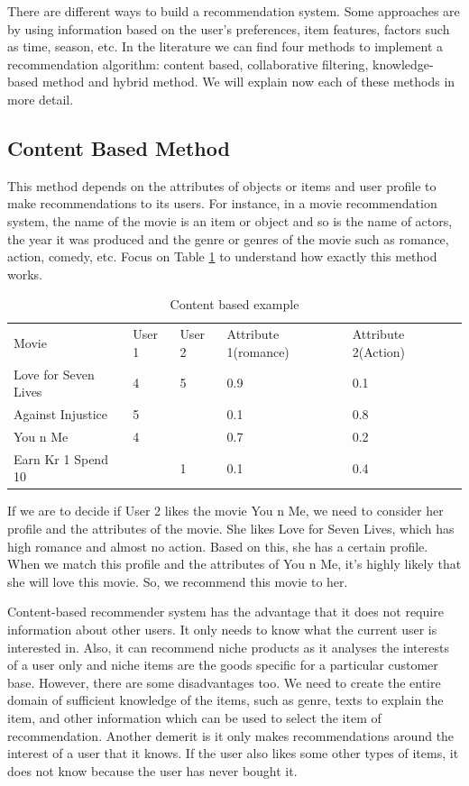 \documentclass{jot}
\begin{document}
There are different ways to build a recommendation system. Some approaches are by using information based on the user’s preferences, item features, factors such as time, season, etc. In the literature we can find four methods to implement a recommendation algorithm: content based, collaborative filtering, knowledge-based method and hybrid method. We will explain now each of these methods in more detail.

\subsection{Content Based Method}
This method depends on the attributes of objects or items and user profile to make recommendations to its users. For instance, in a movie recommendation system, the name of the movie is an item or object and so is the name of actors, the year it was produced and the genre or genres of the movie such as romance, action, comedy, etc. Focus on Table \ref{tab:content-based} to understand how exactly this method works.\\
\begin{table}[h!]
\begin{tabular}{lllll}
Movie                & User 1 & User 2 & Attribute 1(romance) & Attribute 2(Action) \\
Love for Seven Lives & 4      & 5      & 0.9                   & 0.1                  \\
Against Injustice    & 5      &        & 0.1                   & 0.8                  \\
You n Me             & 4      &        & 0.7                   & 0.2                  \\
Earn Kr 1 Spend 10   &        & 1      & 0.1                   & 0.4                  \\
\end{tabular}
\caption{Content based example}
\label{tab:content-based}
\end{table}

If we are to decide if User 2 likes the movie You n Me, we need to consider her profile and the attributes of the movie. She likes Love for Seven Lives, which has high romance and almost no action. Based on this, she has a certain profile. When we match this profile and the attributes of You n Me, it’s highly likely that she will love this movie. So, we recommend this movie to her.

Content-based recommender system has the advantage that it does not require information about other users. It only needs to know what the current user is interested in. Also, it can recommend niche products as it analyses the interests of a user only and niche items are the goods specific for a particular customer base. However, there are some disadvantages too. We need to create the entire domain of sufficient knowledge of the items, such as genre, texts to explain the item, and other information which can be used to select the item of recommendation. Another demerit is it only makes recommendations around the interest of a user that it knows. If the user also likes some other types of items, it does not know because the user has never bought it.
\end{document}
